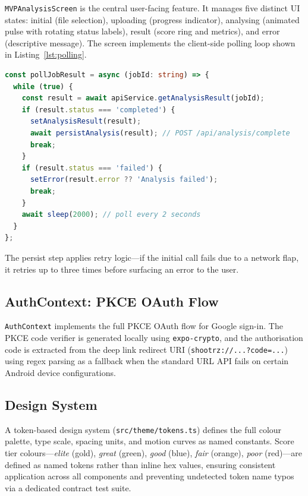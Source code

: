 \lstinline|MVPAnalysisScreen| is the central user-facing feature. It manages five distinct UI states: initial (file selection), uploading (progress indicator), analysing (animated pulse with rotating status labels), result (score ring and metrics), and error (descriptive message). The screen implements the client-side polling loop shown in Listing~\ref{lst:polling}.

\noindent\begin{minipage}{\linewidth}
\begin{lstlisting}[language=TypeScript,
                   caption={Client-side polling loop (simplified from \texttt{MVPAnalysisScreen.tsx}).},
                   label={lst:polling}]
const pollJobResult = async (jobId: string) => {
  while (true) {
    const result = await apiService.getAnalysisResult(jobId);
    if (result.status === 'completed') {
      setAnalysisResult(result);
      await persistAnalysis(result); // POST /api/analysis/complete
      break;
    }
    if (result.status === 'failed') {
      setError(result.error ?? 'Analysis failed');
      break;
    }
    await sleep(2000); // poll every 2 seconds
  }
};
\end{lstlisting}
\end{minipage}

The persist step applies retry logic---if the initial call fails due to a network flap, it retries up to three times before surfacing an error to the user.

\subsection{AuthContext: PKCE OAuth Flow}

\lstinline|AuthContext| implements the full PKCE OAuth flow for Google sign-in. The PKCE code verifier is generated locally using \lstinline|expo-crypto|, and the authorisation code is extracted from the deep link redirect URI (\lstinline|shootrz://...?code=...|) using regex parsing as a fallback when the standard URL API fails on certain Android device configurations.

\subsection{Design System}

A token-based design system (\lstinline|src/theme/tokens.ts|) defines the full colour palette, type scale, spacing units, and motion curves as named constants. Score tier colours---\textit{elite} (gold), \textit{great} (green), \textit{good} (blue), \textit{fair} (orange), \textit{poor} (red)---are defined as named tokens rather than inline hex values, ensuring consistent application across all components and preventing undetected token name typos via a dedicated contract test suite.

